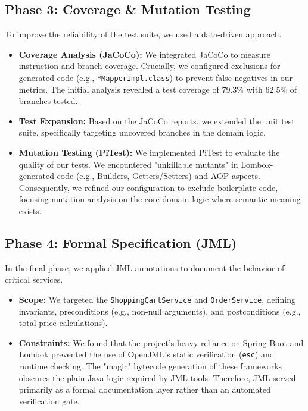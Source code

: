 \subsection{Phase 3: Coverage \& Mutation Testing}
To improve the reliability of the test suite, we used a data-driven approach.
\begin{itemize}
    \item \textbf{Coverage Analysis (JaCoCo):} We integrated JaCoCo to measure instruction and branch coverage. Crucially, we configured exclusions for generated code (e.g., \texttt{*MapperImpl.class}) to prevent false negatives in our metrics. The initial analysis revealed a test coverage of 79.3\% with 62.5\% of branches tested.
    \item \textbf{Test Expansion:} Based on the JaCoCo reports, we extended the unit test suite, specifically targeting uncovered branches in the domain logic.
    \item \textbf{Mutation Testing (PiTest):} We implemented PiTest to evaluate the quality of our tests. We encountered "unkillable mutants" in Lombok-generated code (e.g., Builders, Getters/Setters) and AOP aspects. Consequently, we refined our configuration to exclude boilerplate code, focusing mutation analysis on the core domain logic where semantic meaning exists.
\end{itemize}

\subsection{Phase 4: Formal Specification (JML)}
In the final phase, we applied JML annotations to document the behavior of critical services.
\begin{itemize}
    \item \textbf{Scope:} We targeted the \texttt{ShoppingCartService} and \texttt{OrderService}, defining invariants, preconditions (e.g., non-null arguments), and postconditions (e.g., total price calculations).
    \item \textbf{Constraints:} We found that the project's heavy reliance on Spring Boot and Lombok prevented the use of OpenJML's static verification (\texttt{esc}) and runtime checking. The "magic" bytecode generation of these frameworks obscures the plain Java logic required by JML tools. Therefore, JML served primarily as a formal documentation layer rather than an automated verification gate.
\end{itemize}

